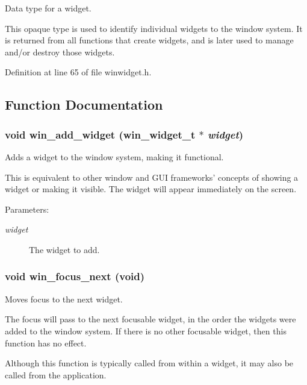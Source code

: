 Data type for a widget. 

This opaque type is used to identify individual widgets to the window system. It is returned from all functions that create widgets, and is later used to manage and/or destroy those widgets. 

Definition at line 65 of file winwidget.h.

\subsection{Function Documentation}
\subsubsection{\setlength{\rightskip}{0pt plus 5cm}void win\_\-add\_\-widget ({\bf win\_\-widget\_\-t} $\ast$ {\em widget})}\label{winwidget_8h_a3}


Adds a widget to the window system, making it functional. 

This is equivalent to other window and GUI frameworks' concepts of showing a widget or making it visible. The widget will appear immediately on the screen.

\begin{Desc}
\item[Parameters:]
\begin{description}
\item[{\em widget}]The widget to add. \end{description}
\end{Desc}
\subsubsection{\setlength{\rightskip}{0pt plus 5cm}void win\_\-focus\_\-next (void)}\label{winwidget_8h_a5}


Moves focus to the next widget. 

The focus will pass to the next focusable widget, in the order the widgets were added to the window system. If there is no other focusable widget, then this function has no effect.

Although this function is typically called from within a widget, it may also be called from the application. 
